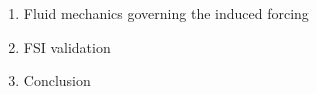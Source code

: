 \documentclass{article}
\begin{document}
\begin{enumerate}
\item Fluid mechanics governing the induced forcing
\item FSI validation
\item Conclusion
\end{enumerate}
\end{document}
